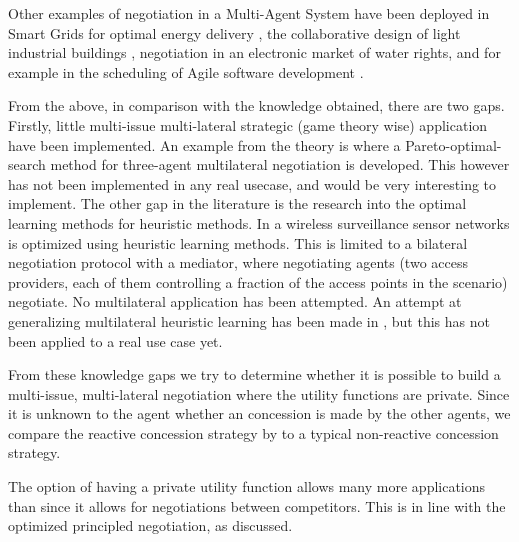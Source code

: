 Other examples of negotiation in a Multi-Agent System have been deployed in Smart Grids for optimal energy delivery \citep{pipattanasomporn2009multi}, the collaborative design of light industrial buildings \citep{anumba2003negotiation}, negotiation in an electronic market of water rights, and for example in the scheduling of Agile software development \citep{rabelo1999multi}.

From the above, in comparison with the knowledge obtained, there are two gaps. Firstly, little multi-issue multi-lateral strategic (game theory wise) application have been implemented. An example from the theory is \citet{wu2009efficient} where a Pareto-optimal-search method for three-agent multilateral negotiation is developed. This however has not been implemented in any real usecase, and would be very interesting to implement. The other gap in the literature is the research into the optimal learning methods for heuristic methods. In \citet{de2015automated} a wireless surveillance sensor networks is optimized using heuristic learning methods. This is limited to a bilateral negotiation protocol with a mediator, where negotiating agents (two access providers, each of them controlling a fraction of the access points in the scenario) negotiate. No multilateral application has been attempted. An attempt at generalizing multilateral heuristic learning has been made in \citet{beheshti2014homan}, but this has not been applied to a real use case yet. 

From these knowledge gaps we try to determine whether it is possible to build a multi-issue, multi-lateral negotiation where the utility functions are private. Since it is unknown to the agent whether an concession is made by the other agents, we compare the reactive concession strategy by \citet{zheng2015automated} to a typical non-reactive concession strategy.

The option of having a private utility function allows many more applications than since it allows for negotiations between competitors. This is in line with the optimized principled negotiation, as discussed.

